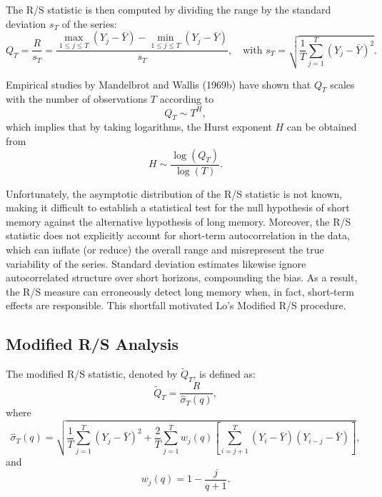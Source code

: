 \documentclass[11pt]{extarticle}
\begin{document}
The R/S statistic is then computed by dividing the range by the standard deviation \(s_T\) of the series:
\begin{equation}
    Q_T = \frac{R}{s_T} = \frac{\max_{1 \leq j \leq T} \left( Y_j - \bar{Y} \right) - \min_{1 \leq j \leq T} \left( Y_j - \bar{Y} \right)}{s_T}, \quad \text{with } s_T = \sqrt{\frac{1}{T} \sum_{j=1}^{T} \left( Y_j - \bar{Y} \right)^2}.
\end{equation}

Empirical studies by Mandelbrot and Wallis (1969b) have shown that \(Q_T\) scales with the number of observations \(T\) according to
\begin{equation}
    Q_T \sim T^H,
\end{equation}
which implies that by taking logarithms, the Hurst exponent \(H\) can be obtained from
\begin{equation}
    H \sim \frac{\log(Q_T)}{\log(T)}.
\end{equation}

Unfortunately, the asymptotic distribution of the R/S statistic is not known, making it difficult to establish a
statistical test for the null hypothesis of short memory against the alternative hypothesis of long memory. Moreover,
the R/S statistic does not explicitly account for short-term autocorrelation in the data, which can inflate (or reduce)
the overall range and misrepresent the true variability of the series. Standard deviation estimates likewise ignore
autocorrelated structure over short horizons, compounding the bias.
As a result, the R/S measure can erroneously detect long memory when, in fact, short-term effects are responsible.
This shortfall motivated Lo’s Modified R/S procedure.

\subsection{Modified R/S Analysis}
\label{sec:modified_rs}

The modified R/S statistic, denoted by \(\tilde{Q}_T\), is defined as:
\begin{equation}
    \tilde{Q}_T = \frac{R}{\hat{\sigma}_T(q)},
\end{equation}
where
\begin{equation}
    \hat{\sigma}_T(q) = \sqrt{\frac{1}{T} \sum_{j=1}^{T} (Y_j - \bar{Y})^2 + \frac{2}{T} \sum_{j=1}^{T} w_j(q) \left[ \sum_{i=j+1}^{T} (Y_i - \bar{Y})(Y_{i-j} - \bar{Y}) \right]},
\end{equation}
and
\begin{equation}
    w_j(q) = 1 - \frac{j}{q + 1}.
\end{equation}
\end{document}

